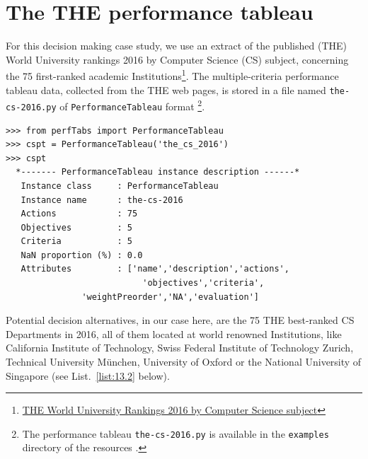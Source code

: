 \section{The THE performance tableau}
\label{sec:13.1}

For this decision making case study, we use an extract of the published \THE (THE) World University rankings 2016 by Computer Science (CS) subject, concerning the 75 first-ranked academic Institutions\footnote{\href{https://www.timeshighereducation.com/world-university-rankings/2017/subject-ranking/computer-science}{THE World University Rankings 2016 by Computer Science subject}}. The multiple-criteria performance tableau data, collected from the THE web pages, is stored in a file named \texttt{the-cs-2016.py} of \texttt{PerformanceTableau} format \footnote{The performance tableau \texttt{the-cs-2016.py} is available in the \texttt{examples} directory of the \Digraph resources \citep{BIS-2021}.}. 
\begin{lstlisting}[caption={Performance tableau of the },label=list:13.1]
>>> from perfTabs import PerformanceTableau
>>> cspt = PerformanceTableau('the_cs_2016')
>>> cspt
  *------- PerformanceTableau instance description ------*
   Instance class     : PerformanceTableau
   Instance name      : the-cs-2016
   Actions            : 75
   Objectives         : 5
   Criteria           : 5
   NaN proportion (%) : 0.0
   Attributes         : ['name','description','actions',
                           'objectives','criteria',
			   'weightPreorder','NA','evaluation']
\end{lstlisting}

Potential decision alternatives, in our case here, are the 75 THE best-ranked CS Departments in 2016, all of them located at world renowned Institutions, like California Institute of Technology, Swiss Federal Institute of Technology Zurich, Technical University München, University of Oxford or the National University of Singapore (see List.~\vref{list:13.2} below). 

